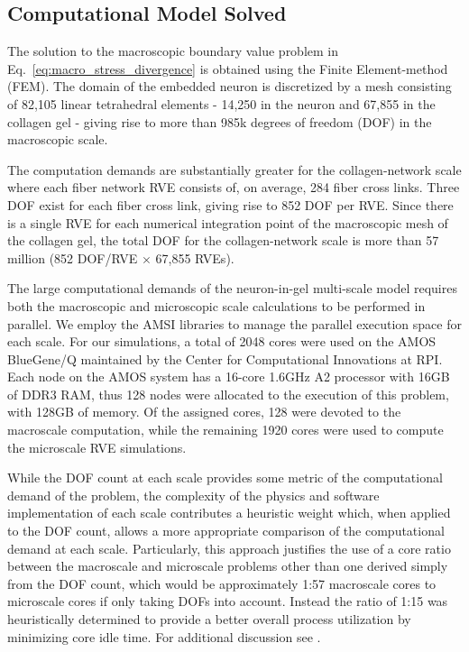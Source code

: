 \documentclass[]{interact}
\begin{document}
\subsection{Computational Model Solved}\label{sec:specification}
The solution to the macroscopic boundary value problem in Eq.\ \eqref{eq:macro_stress_divergence} is obtained using the Finite Element-method (FEM). The domain of the embedded neuron is discretized by a mesh consisting of  82,105 linear tetrahedral elements - 14,250 in the neuron and 67,855 in the collagen gel - giving rise to more than 985k degrees of freedom (DOF) in the macroscopic scale.

The computation demands are substantially greater for the collagen-network scale where each fiber network RVE consists of, on average, 284 fiber cross links. Three DOF exist for each fiber cross link, giving rise to 852 DOF per RVE. Since there is a single RVE for each numerical integration point of the macroscopic mesh of the collagen gel, the total DOF for the collagen-network scale is more than 57 million (852 DOF/RVE $\times$ 67,855 RVEs). 

The large computational demands of the neuron-in-gel multi-scale model requires both the macroscopic and microscopic scale calculations to be performed in parallel. We employ the AMSI libraries to manage the parallel execution space for each scale. For our simulations, a total of 2048 cores were used on the AMOS BlueGene/Q maintained by the Center for Computational Innovations at RPI. Each node on the AMOS system has a 16-core 1.6GHz A2 processor with 16GB of DDR3 RAM, thus 128 nodes were allocated to the execution of this problem, with 128GB of memory. Of the assigned cores, 128 were devoted to the macroscale computation, while the remaining 1920 cores were used to compute the microscale RVE simulations. 

While the DOF count at each scale provides some metric of the computational demand of the problem, the complexity of the physics and software implementation of each scale contributes a heuristic weight which, when applied to the DOF count, allows a more appropriate comparison of the computational demand at each scale. Particularly, this approach justifies the use of a core ratio between the macroscale and microscale problems other than one derived simply from the DOF count, which would be approximately 1:57 macroscale cores to microscale cores if only taking DOFs into account. Instead the ratio of 1:15 was heuristically determined to provide a better overall process utilization by minimizing core idle time. For additional discussion see \citep{Tobin:2017ip}.
\end{document}
